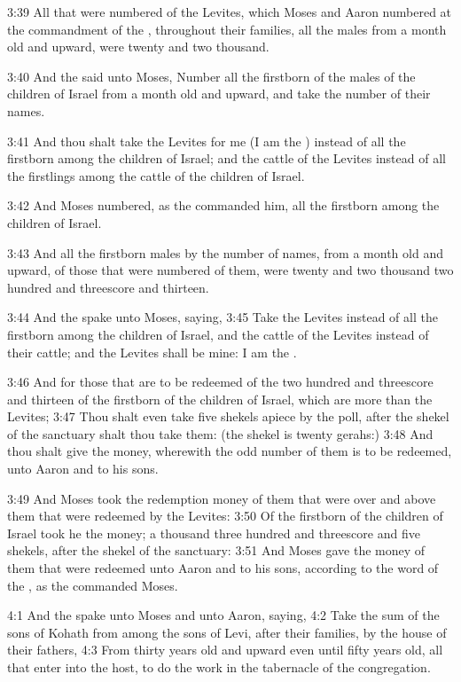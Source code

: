 3:39 All that were numbered of the Levites, which Moses and Aaron numbered at the commandment of the \LORD, throughout their families, all the males from a month old and upward, were twenty and two thousand.

3:40 And the \LORD said unto Moses, Number all the firstborn of the males of the children of Israel from a month old and upward, and take the number of their names.

3:41 And thou shalt take the Levites for me (I am the \LORD) instead of all the firstborn among the children of Israel; and the cattle of the Levites instead of all the firstlings among the cattle of the children of Israel.

3:42 And Moses numbered, as the \LORD commanded him, all the firstborn among the children of Israel.

3:43 And all the firstborn males by the number of names, from a month old and upward, of those that were numbered of them, were twenty and two thousand two hundred and threescore and thirteen.

3:44 And the \LORD spake unto Moses, saying, 3:45 Take the Levites instead of all the firstborn among the children of Israel, and the cattle of the Levites instead of their cattle; and the Levites shall be mine: I am the \LORD.

3:46 And for those that are to be redeemed of the two hundred and threescore and thirteen of the firstborn of the children of Israel, which are more than the Levites; 3:47 Thou shalt even take five shekels apiece by the poll, after the shekel of the sanctuary shalt thou take them: (the shekel is twenty gerahs:) 3:48 And thou shalt give the money, wherewith the odd number of them is to be redeemed, unto Aaron and to his sons.

3:49 And Moses took the redemption money of them that were over and above them that were redeemed by the Levites: 3:50 Of the firstborn of the children of Israel took he the money; a thousand three hundred and threescore and five shekels, after the shekel of the sanctuary: 3:51 And Moses gave the money of them that were redeemed unto Aaron and to his sons, according to the word of the \LORD, as the \LORD commanded Moses.

4:1 And the \LORD spake unto Moses and unto Aaron, saying, 4:2 Take the sum of the sons of Kohath from among the sons of Levi, after their families, by the house of their fathers, 4:3 From thirty years old and upward even until fifty years old, all that enter into the host, to do the work in the tabernacle of the congregation.

